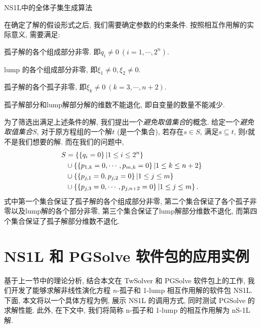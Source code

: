 \begin{algorithm}
\caption{NS1L中的全体子集生成算法}\label{allsubset}
\end{algorithm}

在确定了解的假设形式之后, 我们需要确定参数的约束条件. 按照相互作用解的实际意义, 需要满足:
\begin{compactenum}[(1)]
\item 孤子解的各个组成部分非零. 即$q_i\neq 0~(i=1,\cdots,2^n)$.
\item lump 的各个组成部分非零, 即$\xi_1\neq 0,\xi_2\neq 0$.
\item 孤子解的各个孤子非零, 即$\xi_k\neq 0~(k=3,\cdots,n+2)$.
\item 孤子解部分和lump解部分解的维数不能退化, 即自变量的数量不能减少. 
\end{compactenum}

为了筛选出满足上述条件的解, 我们提出一个\emph{避免取值集合}的概念. 给定一个\emph{避免取值集合}$S$, 对于原方程组的一个解$t$ (是一个集合), 若存在$s\in S$, 满足$s\subseteq t$, 则$t$就不是我们想要的解. 而在我们的问题中, 
\begin{equation}
\begin{split}
    S&=\left\{\left\{q_i=0\right\}|1\le i \le 2^n\right\} \\ 
     &\cup \left\{\left\{p_{1,k}=0,\cdots,p_{m,k}=0\right\}|1\le k \le n+2\right\}  \\
     &\cup \left\{\left\{p_{j,1}=0,p_{j,2}=0\right\}|1\le j \le m\right\} \\ 
     &\cup \left\{\left\{p_{j,3}=0,\cdots,p_{j,n+2}=0\right\}|1\le j \le m\right\} . 
\end{split}
\end{equation}
式中第一个集合保证了孤子解的各个组成部分非零, 第二个集合保证了各个孤子非零以及lump解的各个部分非零, 第三个集合保证了lump解部分维数不退化, 而第四个集合保证了孤子解部分维数不退化.

\section{NS1L 和 PGSolve 软件包的应用实例}
基于上一节中的理论分析, 结合本文在 TwSolver 和 PGSolve 软件包上的工作, 我们开发了能够求解非线性演化方程 $n$-孤子和 1-lump 相互作用解的软件包 NS1L. 下面, 本文将以一个具体方程为例, 展示 NS1L 的调用方式, 同时测试 PGSolve 的求解性能. 此外, 在下文中, 我们将简称 n-孤子和 1-lump 的相互作用解为 nS-1L 解. 

